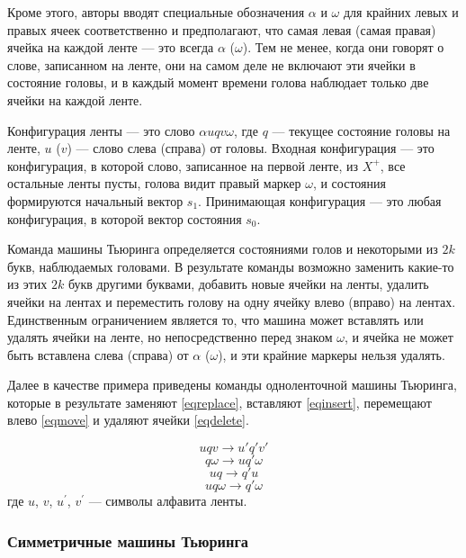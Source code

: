 \documentclass[14pt]{matmex-diploma-custom}
\begin{document}
Кроме этого, авторы вводят специальные обозначения $\alpha$ и $\omega$ для крайних левых и правых ячеек соответственно и предполагают, что самая левая (самая правая) ячейка на каждой ленте --- это всегда
$ \alpha $ ($ \omega $). Тем не менее, когда они говорят о слове, записанном на ленте,
они на самом деле не включают эти ячейки в состояние головы, и в каждый момент времени голова
наблюдает только две ячейки на каждой ленте.

Конфигурация ленты --- это слово $ \alpha u q v \omega $, где $ q $ --- текущее состояние головы на ленте, 
$u$ ($ v $) --- слово слева (справа) от головы. 
Входная конфигурация --- это конфигурация, в которой слово, записанное на первой ленте, из
$X^+$, все остальные ленты пусты, голова видит правый маркер $\omega$, и состояния формируются
начальный вектор $s_1$. Принимающая конфигурация --- это любая конфигурация, в которой вектор состояния
$s_0$. 

Команда машины Тьюринга определяется состояниями голов и некоторыми из
$ 2k $ букв, наблюдаемых головами.
В результате команды возможно заменить какие-то из этих $ 2k $ букв другими буквами,
добавить новые ячейки на ленты, удалить ячейки на лентах и переместить
голову на одну ячейку влево (вправо) на лентах.
Единственным ограничением является то, что машина может вставлять или удалять ячейки на ленте,
но непосредственно перед знаком $ \omega $, и ячейка не может быть вставлена слева (справа) от
$ \alpha $ ($ \omega $), и эти крайние маркеры нельзя удалять.

Далее в качестве примера приведены команды одноленточной машины Тьюринга, 
которые в результате заменяют \eqref{eqreplace},
вставляют \eqref{eqinsert}, перемещают влево \eqref{eqmove} и удаляют ячейки \eqref{eqdelete}.

\begin{equation}
    u q v \to u' q' v' \label{eqreplace}
\end{equation}
\begin{equation}
    q \omega \to u q' \omega \label{eqinsert}
\end{equation}
\begin{equation}
    u q \to q' u \label{eqmove}
\end{equation}
\begin{equation}
    u q \omega \to q' \omega \label{eqdelete}
\end{equation}
где $u$, $v$, $u^{'}$, $v^{'}$ --- символы алфавита ленты. 

\subsubsection{Симметричные машины Тьюринга}
\end{document}
